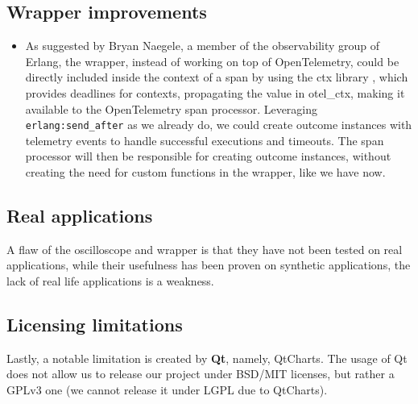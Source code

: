       \subsection{Wrapper improvements}

        \begin{itemize}
            \item As suggested by Bryan Naegele, a member of the observability group of Erlang, the wrapper, instead of working on top of OpenTelemetry, could be directly included inside the context of a span by using the ctx library \cite{ctx}, which provides deadlines for contexts, propagating the value in otel\_ctx, making it available to the OpenTelemetry span processor. Leveraging \texttt{erlang:send\_after} as we already do, we could create outcome instances with telemetry events to handle successful executions and timeouts. The span processor will then be responsible for creating outcome instances, without creating the need for custom functions in the wrapper, like we have now.
        \end{itemize}
   
    \subsection{Real applications}
        A flaw of the oscilloscope and wrapper is that they have not been tested on real applications, while their usefulness has been proven on synthetic applications, the lack of real life applications is a weakness.

    \subsection{Licensing limitations}
    Lastly, a notable limitation is created by \textbf{Qt}, namely, QtCharts. The usage of Qt does not allow us to release our project under BSD/MIT licenses, but rather a GPLv3 one (we cannot release it under LGPL due to QtCharts).

